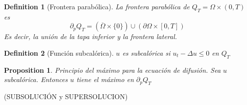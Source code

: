 \documentclass[leqno]{article}
\newtheorem*{proposition}{Proposition}
\newtheorem*{definition}{Definition}
\begin{document}
\begin{definition}[Frontera parabólica]
La frontera parabólica de $Q_T = \Omega \times (0,T)$ es 
\[
  \partial_pQ_T = (\overline{\Omega }\times \{0\})\cup (\partial \Omega \times [0,T])
\] 
Es decir, la unión de la tapa inferior y la frontera lateral.
\end{definition}

\begin{definition}[Función subcalórica] $u$ es subcalórica si $u_t-\Delta u\le 0$ en $Q_T$
\end{definition}

\begin{proposition} Principio del máximo para la ecuación de difusión. Sea $u$ subcalórica. Entonces $u$ tiene el máximo en $\partial_pQ_T$
\end{proposition}



(SUBSOLUCIÓN y SUPERSOLUCION)
\end{document}

